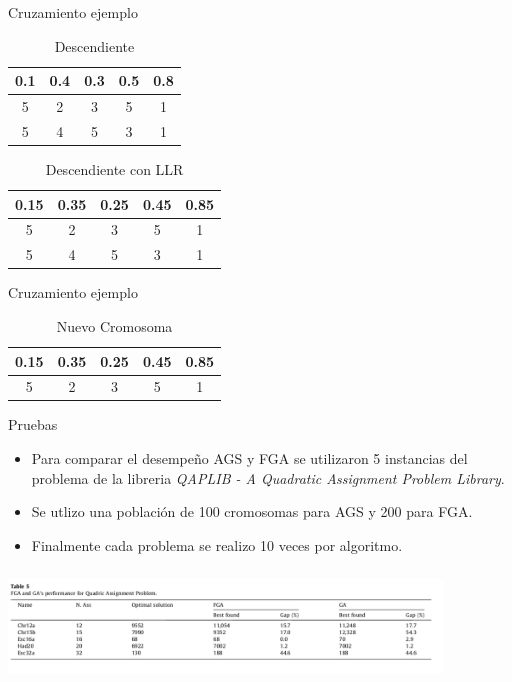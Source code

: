 \documentclass[10pt]{beamer}
\begin{document}
\begin{frame}{Cruzamiento ejemplo}

 	\begin{table}
 		\caption{Descendiente}
 		\begin{tabular}[t]{|c|c||c|c|c|}
			\hline
			0.1 & 0.4 & 0.3 & 0.5 & 0.8 \\
			\hline
			5 & 2  & 3 & 5 & 1\\
			\hline
			5 & 4 & 5 & 3 & 1\\
			\hline
		\end{tabular}
 	\end{table}
 	
 	 	\begin{table}
 		\caption{Descendiente con LLR}
 		\begin{tabular}[t]{|c|c||c|c|c|}
			\hline
			0.15 & 0.35 & 0.25 & 0.45 & 0.85 \\
			\hline
			5 & 2  & 3 & 5 & 1\\
			\hline
			5 & 4 & 5 & 3 & 1\\
			\hline
		\end{tabular}
 	\end{table}
 	

\end{frame}


\begin{frame}{Cruzamiento ejemplo}

 	 \begin{table}
 		\caption{Nuevo Cromosoma}
 		\begin{tabular}[t]{|c|c||c|c|c|}
			\hline
			0.15 & 0.35 & 0.25 & 0.45 & 0.85 \\
			\hline
			5 & 2  & 3 & 5 & 1\\
			\hline
		\end{tabular}
 	\end{table}
 	
\end{frame}


\begin{frame}{Pruebas}

	\begin{itemize}
	
	\item Para comparar el desempeño AGS y FGA se utilizaron 5 instancias del problema
	de la libreria \textit{QAPLIB - A Quadratic Assignment Problem Library}.
	
	\item Se utlizo una población de 100 cromosomas para AGS y 200 para FGA.
	
	\item Finalmente cada problema se realizo 10 veces por algoritmo.
	
	\end{itemize}
	
	\includegraphics[width=11.5cm, height=3cm]{value}


\end{frame}
\end{document}
